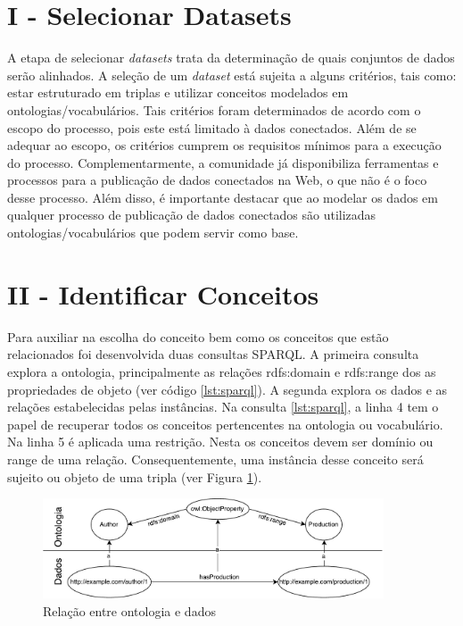 \section{I - Selecionar Datasets}
A etapa de selecionar \textit{datasets} trata da determinação de quais conjuntos de dados serão alinhados. A seleção de um \textit{dataset} está sujeita a alguns critérios, tais como: estar estruturado em triplas e utilizar conceitos modelados em ontologias/vocabulários. Tais critérios foram determinados de acordo com o escopo do processo, pois este está limitado à dados conectados. Além de se adequar ao escopo, os critérios cumprem os requisitos mínimos para a execução do processo.
Complementarmente, a comunidade já disponibiliza ferramentas e processos para a publicação de dados conectados na Web, o que não é o foco desse processo. Além disso, é importante destacar que ao modelar os dados em qualquer processo de publicação de dados conectados são utilizadas ontologias/vocabulários que podem servir como base.

\section{II - Identificar Conceitos}
\label{sec:prop_identificar}
Para auxiliar na escolha do conceito bem como os conceitos que estão relacionados foi desenvolvida duas consultas SPARQL. A primeira consulta explora a ontologia, principalmente as relações rdfs:domain e rdfs:range dos  as propriedades de objeto (ver código \ref{lst:sparql}). A segunda explora os dados e as relações estabelecidas pelas instâncias.
Na consulta \ref{lst:sparql}, a linha 4 tem o papel de recuperar todos os conceitos pertencentes na ontologia ou vocabulário. Na linha 5 é aplicada uma restrição. Nesta os conceitos devem ser domínio ou range de uma relação. Consequentemente, uma instância desse conceito será sujeito ou objeto de uma tripla (ver Figura \ref{fig:subgrafo1}).
\begin{figure}[!h]
	\centering
	\includegraphics[width=0.9\textwidth]{./imagens/subgrafo_semantico.pdf}
	\caption{Relação entre ontologia e dados}
	\label{fig:subgrafo1}
\end{figure}

